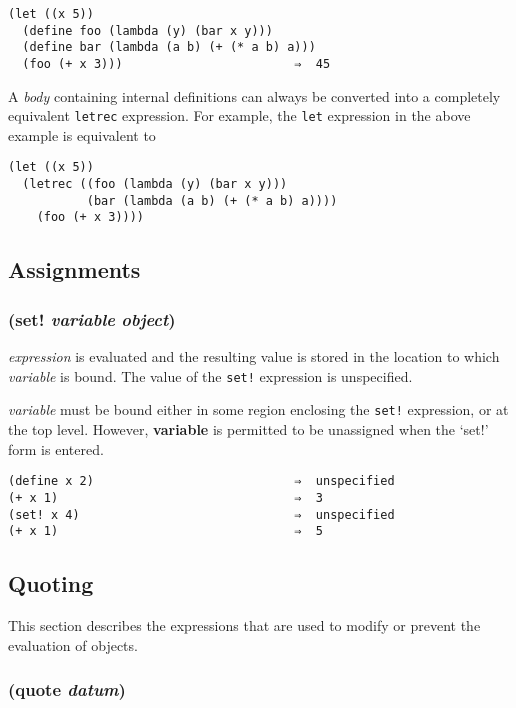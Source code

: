 \documentclass{article}
\begin{document}
\begin{verbatim}
(let ((x 5))
  (define foo (lambda (y) (bar x y)))
  (define bar (lambda (a b) (+ (* a b) a)))
  (foo (+ x 3)))                        ⇒  45
\end{verbatim}

A \emph{body} containing internal definitions can always be converted into a completely
equivalent \verb|letrec| expression. For example, the \verb|let| expression in the above
example is equivalent to

\begin{verbatim}
(let ((x 5))
  (letrec ((foo (lambda (y) (bar x y)))
           (bar (lambda (a b) (+ (* a b) a))))
    (foo (+ x 3))))
\end{verbatim}

\subsection{Assignments}\label{sec:assignments}

\subsubsection{(set! \emph{variable} \emph{object})}

\emph{expression} is evaluated and the resulting value is stored in the location to which
\emph{variable} is bound. The value of the \verb|set!| expression is unspecified.

\emph{variable} must be bound either in some region enclosing the \verb|set!|
expression, or at the top level. However, \textbf{variable} is permitted to be
unassigned when the `set!' form is entered.

\begin{verbatim}
(define x 2)                            ⇒  unspecified
(+ x 1)                                 ⇒  3
(set! x 4)                              ⇒  unspecified
(+ x 1)                                 ⇒  5
\end{verbatim}

\subsection{Quoting}\label{sec:quoting}

This section describes the expressions that are used to modify or prevent the evaluation of
objects.

\subsubsection{(quote \emph{datum})}
\end{document}
